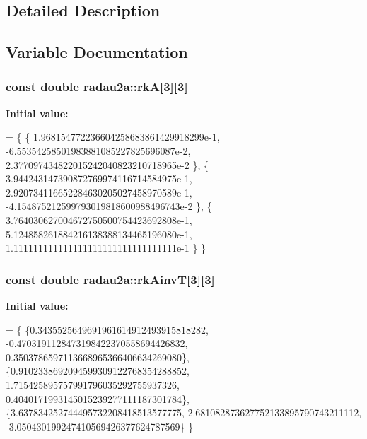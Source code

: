 \subsection{Detailed Description}


\subsection{Variable Documentation}
\subsubsection[{\texorpdfstring{rkA}{rkA}}]{\setlength{\rightskip}{0pt plus 5cm}const double radau2a\+::rkA\mbox{[}3\mbox{]}\mbox{[}3\mbox{]}\hspace{0.3cm}{\ttfamily [static]}}\hypertarget{group__RK__Params_ga37314d1d93d3f053f469c40c5d42a43e}{}\label{group__RK__Params_ga37314d1d93d3f053f469c40c5d42a43e}
{\bfseries Initial value\+:}
\begin{DoxyCode}
= \{ \{
     1.968154772236604258683861429918299e-1,
    -6.55354258501983881085227825696087e-2,
     2.377097434822015242040823210718965e-2
    \}, \{
     3.944243147390872769974116714584975e-1,
     2.920734116652284630205027458970589e-1,
    -4.154875212599793019818600988496743e-2
    \}, \{
     3.764030627004672750500754423692808e-1,
     5.124858261884216138388134465196080e-1,
     1.111111111111111111111111111111111e-1
    \}
\}
\end{DoxyCode}
\subsubsection[{\texorpdfstring{rk\+AinvT}{rkAinvT}}]{\setlength{\rightskip}{0pt plus 5cm}const double radau2a\+::rk\+AinvT\mbox{[}3\mbox{]}\mbox{[}3\mbox{]}\hspace{0.3cm}{\ttfamily [static]}}\hypertarget{group__RK__Params_gaf7c73eb3be684541be92d125fef651bc}{}\label{group__RK__Params_gaf7c73eb3be684541be92d125fef651bc}
{\bfseries Initial value\+:}
\begin{DoxyCode}
= \{
\{0.3435525649691961614912493915818282,
-0.4703191128473198422370558694426832,
0.3503786597113668965366406634269080\},
\{0.9102338692094599309122768354288852,
1.715425895757991796035292755937326,
0.4040171993145015239277111187301784\},
\{3.637834252744495732208418513577775,
2.681082873627752133895790743211112,
-3.050430199247410569426377624787569\}
\}
\end{DoxyCode}

